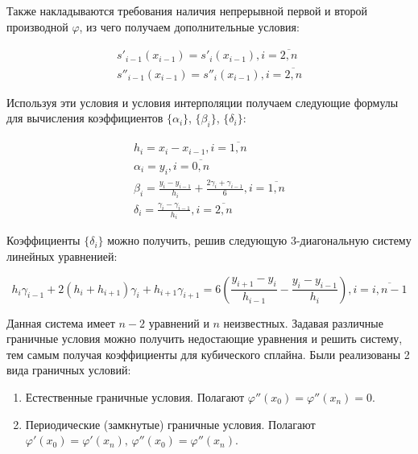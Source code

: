Также накладываются требования наличия непрерывной первой и второй производной $\varphi$, из чего получаем дополнительные условия:

\begin{equation}
  \begin{gathered}
    s'_{i-1}(x_{i-1}) = s'_i(x_{i-1}), i = \overline{2, n} \\
    s''_{i-1}(x_{i-1}) = s''_i(x_{i-1}), i = \overline{2, n}
  \end{gathered}
\end{equation}

Используя эти условия и условия интерполяции получаем следующие формулы для вычисления коэффициентов $\{\alpha_i\}$, $\{\beta_i\}$, $\{\delta_i\}$:

\begin{equation}
  \begin{gathered}
    h_i = x_i - x_{i-1}, i = \overline{1, n} \\
    \alpha_i = y_i, i = \overline{0, n} \\
    \beta_i = \frac{y_i - y_{i-1}}{h_i} + \frac{2\gamma_i + \gamma_{i - 1}}{6}, i = \overline{1, n} \\
    \delta_i = \frac{\gamma_i - \gamma_{i-1}}{h_i}, i = \overline{2, n}
  \end{gathered}
\end{equation}

Коэффициенты $\{\delta_i\}$ можно получить, решив следующую 3-диагональную систему линейных уравненией:

\begin{equation}
  h_i \gamma_{i-1} + 2(h_i + h_{i+1})\gamma_i + h_{i+1}\gamma_{i+1} =
  6 (\frac{y_{i+1} - y_i}{h_{i-1}} - \frac{y_i - y_{i-1}}{h_i}), i = \overline{i, n - 1}
\end{equation}

Данная система имеет $n-2$ уравнений и $n$ неизвестных. Задавая различные граничные условия можно получить недостающие уравнения и решить систему, тем самым получая коэффициенты для кубического сплайна. Были реализованы 2 вида граничных условий:

\begin{enumerate}
\item Естественные граничные условия. Полагают $\varphi''(x_0)= \varphi''(x_n)=0$.
\item Периодические (замкнутые) граничные условия. Полагают $\varphi'(x_0)=\varphi'(x_n),\, \varphi''(x_0)=\varphi''(x_n)$.
\end{enumerate}

